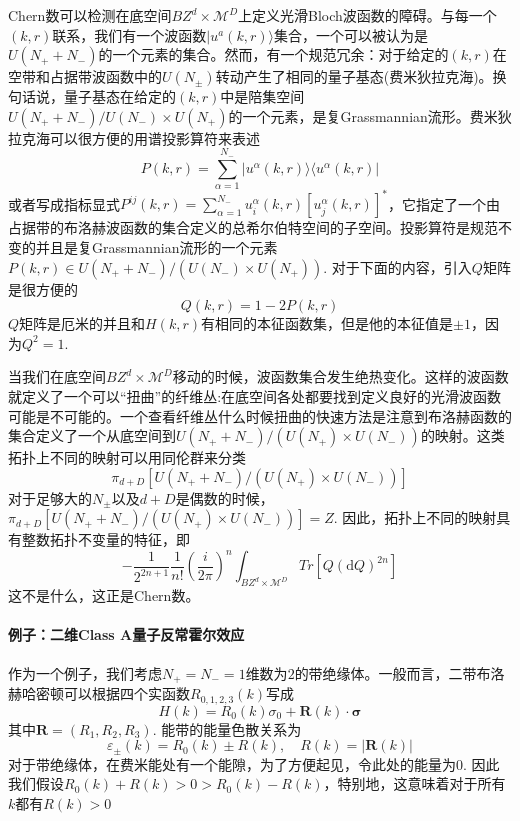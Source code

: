 \documentclass{article}
\numberwithin{equation}{subsection}
\begin{document}
Chern数可以检测在底空间$BZ^d\times\mathcal{M}^D$上定义光滑Bloch波函数的障碍。与每一个$(k,r)$联系，我们有一个波函数$|u^a(k,r)\rangle$集合，一个可以被认为是$U(N_++N_-)$的一个元素的集合。然而，有一个规范冗余：对于给定的$(k,r)$在空带和占据带波函数中的$U(N_{\pm})$转动产生了相同的量子基态(费米狄拉克海)。换句话说，量子基态在给定的$(k,r)$中是陪集空间$U(N_++N_-)/U(N_-)\times U(N_+)$的一个元素，是复Grassmannian流形。费米狄拉克海可以很方便的用谱投影算符来表述
\begin{equation}
    P(k,r)=\sum_{\alpha=1}^{N_-}|u^\alpha(k,r)\rangle\langle u^\alpha(k,r)|
\end{equation}
或者写成指标显式$P^{ij}(k,r)=\sum_{\alpha=1}^{N_-}u_i^\alpha(k,r)[u_j^\alpha(k,r)]^*$，它指定了一个由占据带的布洛赫波函数的集合定义的总希尔伯特空间的子空间。投影算符是规范不变的并且是复Grassmannian流形的一个元素$P(k,r)\in U(N_++N_-)/(U(N_-)\times U(N_+))$. 对于下面的内容，引入$Q$矩阵是很方便的
\begin{equation}
    Q(k,r)=1-2P(k,r)
\end{equation}
$Q$矩阵是厄米的并且和$H(k,r)$有相同的本征函数集，但是他的本征值是$\pm 1$，因为$Q^2=1$.

当我们在底空间$BZ^d\times \mathcal{M}^D$移动的时候，波函数集合发生绝热变化。这样的波函数就定义了一个可以“扭曲”的纤维丛:在底空间各处都要找到定义良好的光滑波函数可能是不可能的。一个查看纤维丛什么时候扭曲的快速方法是注意到布洛赫函数的集合定义了一个从底空间到$U(N_++N_-)/(U(N_+)\times U(N_-))$的映射。这类拓扑上不同的映射可以用同伦群来分类
\begin{equation}
    \pi_{d+D}[U(N_++N_-)/(U(N_+)\times U(N_-))]
\end{equation}
对于足够大的$N_\pm$以及$d+D$是偶数的时候，$\pi_{d+D}[U(N_++N_-)/(U(N_+)\times U(N_-))]=Z$. 因此，拓扑上不同的映射具有整数拓扑不变量的特征，即
\begin{equation}
    -\frac{1}{2^{2n+1}}\frac{1}{n!}\left(\frac{i}{2\pi}\right)^n\int_{BZ^d\times \mathcal{M}^D}Tr[Q(\mathrm{d}Q)^{2n}]
\end{equation}
这不是什么，这正是Chern数。
\paragraph{例子：二维Class A量子反常霍尔效应}
作为一个例子，我们考虑$N_+=N_-=1$维数为$2$的带绝缘体。一般而言，二带布洛赫哈密顿可以根据四个实函数$R_{0,1,2,3}(k)$写成
\begin{equation}
    H(k)=R_0(k)\sigma_0+\mathbf{R}(k)\cdot \mathbf{\sigma}
\end{equation}
其中$\mathbf{R}=(R_1,R_2,R_3)$. 能带的能量色散关系为
\begin{equation}
    \varepsilon_{\pm}(k)=R_0(k)\pm R(k),\quad R(k)=|\mathbf{R}(k)|
\end{equation}
对于带绝缘体，在费米能处有一个能隙，为了方便起见，令此处的能量为$0$. 因此我们假设$R_0(k)+R(k)>0>R_0(k)-R(k)$，特别地，这意味着对于所有$k$都有$R(k)>0$
\end{document}
